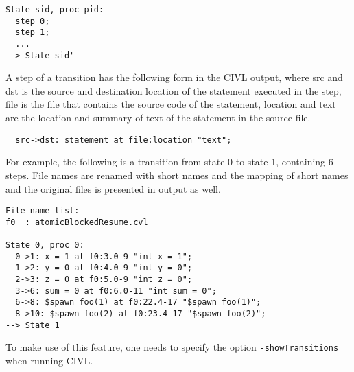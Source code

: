 \begin{verbatim}
State sid, proc pid: 
  step 0;
  step 1;
  ...
--> State sid'
\end{verbatim}

A step of a transition has the following form in the CIVL output,
where src and dst is the source and destination location of the
statement executed in the step, file is the file that contains the
source code of the statement, location and text are the location and
summary of text of the statement in the source file.

\begin{verbatim}
  src->dst: statement at file:location "text";
\end{verbatim}

For example, the following is a transition from state 0 to state 1,
containing 6 steps. File names are renamed with short names and the
mapping of short names and the original files is presented in output
as well.

\begin{verbatim}
File name list:
f0	: atomicBlockedResume.cvl

State 0, proc 0: 
  0->1: x = 1 at f0:3.0-9 "int x = 1";
  1->2: y = 0 at f0:4.0-9 "int y = 0";
  2->3: z = 0 at f0:5.0-9 "int z = 0";
  3->6: sum = 0 at f0:6.0-11 "int sum = 0";
  6->8: $spawn foo(1) at f0:22.4-17 "$spawn foo(1)";
  8->10: $spawn foo(2) at f0:23.4-17 "$spawn foo(2)";
--> State 1
\end{verbatim}

To make use of this feature, one needs to specify the option
\texttt{-showTransitions} when running CIVL.

